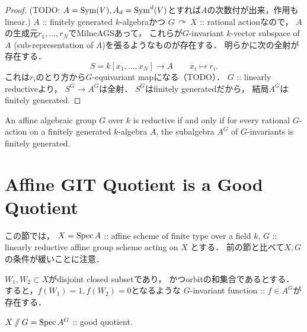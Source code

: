 \documentclass[a4paper]{jsarticle}
\newcommand{\acton}{\,\curvearrowright\,}
\begin{document}
    \begin{proof}
        (TODO: $A=\operatorname{Sym}(V), A_d=\operatorname{Sym}^d(V)$とすれば$A$の次数付が出来，作用もlinear.)
        $A$ :: finitely generated $k$-algebraかつ
        $G \acton X$ :: rational actionなので，
        $A$の生成元$r_1, \dots, r_N$でMilneAGSあって，
        これらが$G$-invariant $k$-vector subspace of $A$
        (sub-representation of $A$)を張るようなものが存在する．
        明らかに次の全射が存在する．
        \[ S=k[x_1,\dots,x_N] \to A \qquad x_i \mapsto r_i. \]
        これは$r_i$のとり方から$G$-equivariant mapになる（TODO）．
        $G$ :: linearly reductiveより，
        $S^G \to A^G$は全射．
        $S^G$はfinitely generatedだから，
        結局$A^G$はfinitely generated.
    \end{proof}

    \begin{Thm}
        An affine algebraic group $G$ over $k$ is reductive
        if and only if
        for every rational $G$-action on a finitely generated $k$-algebra $A$,
        the subalgebra $A^G$ of $G$-invariants is finitely generated.
    \end{Thm}


\section{Affine GIT Quotient is a Good Quotient}
    この節では，
    $X=\operatorname{Spec} A$ :: affine scheme of finite type over a field $k$,
    $G$ :: linearly reductive affine group scheme acting on $X$
    とする．
    前の節と比べて$X, G$の条件が緩いことに注意．

    \begin{Lemma}
        $W_1, W_2 \subset X$がdisjoint closed subsetであり，
        かつorbitの和集合であるとする．
        すると，$f(W_1)=1, f(W_2)=0$となるような
        $G$-invariant function :: $f \in A^G$が存在する．
    \end{Lemma}

    \begin{Thm}\label{thm:git=good}
        $X \sslash G=\operatorname{Spec} A^G$ :: good quotient.
    \end{Thm}
\end{document}
